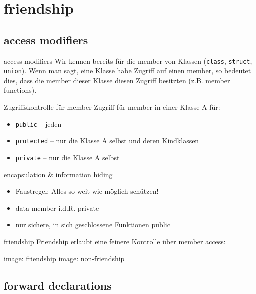 \section{friendship}

\subsection{access modifiers}

\begin{frame}[fragile]{access modifiers}
	Wir kennen bereits für die member von Klassen (\verb|class|, \verb|struct|, \verb|union|).
	Wenn man sagt, eine Klasse habe Zugriff auf einen member, so bedeutet dies, dass die member dieser Klasse diesen Zugriff besitzten (z.B. member functions).
	
	\pause
	
	\begin{block}{Zugriffskontrolle für member}
		Zugriff für member in einer Klasse A für:
		\begin{itemize}[<+->]
			\item \verb|public| -- jeden
			\item \verb|protected| -- nur die Klasse A selbst und deren Kindklassen
			\item \verb|private| -- nur die Klasse A selbst
		\end{itemize}
	\end{block}
\end{frame}

\begin{frame}{encapsulation \& information hiding}
	\begin{itemize}[<+->]
		\item Faustregel: Alles so weit wie möglich schützen!
		\item data member i.d.R. private
		\item nur sichere, in sich geschlossene Funktionen public
	\end{itemize}
\end{frame}

\begin{frame}{friendship}
	Friendship erlaubt eine feinere Kontrolle über member access:
	
	{%
		image: friendship
	}{%
		image: non-friendship
	}
\end{frame}


\subsection{forward declarations}

